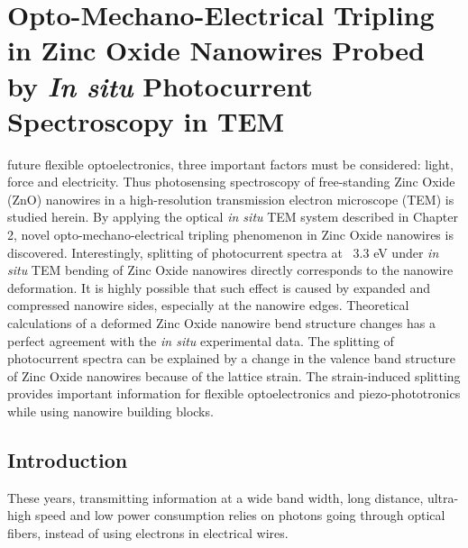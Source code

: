 

\chapter{Opto-Mechano-Electrical Tripling in Zinc Oxide Nanowires Probed by \emph{In situ} Photocurrent Spectroscopy in TEM}

 future flexible optoelectronics, three important factors must be considered: light, force and electricity. 
Thus photosensing spectroscopy of free-standing Zinc Oxide (ZnO) nanowires in a high-resolution transmission electron microscope (TEM) is studied herein. 
By applying the optical {\em in situ} TEM system described in Chapter 2, novel opto-mechano-electrical tripling phenomenon in Zinc Oxide nanowires is discovered. 
Interestingly, splitting of photocurrent spectra at ~3.3 eV under {\em in situ} TEM bending of Zinc Oxide nanowires directly corresponds to the nanowire deformation. It is highly possible that such effect is caused by expanded and compressed nanowire sides, especially at the nanowire edges. 
Theoretical calculations of a deformed Zinc Oxide nanowire bend structure changes has a perfect agreement with the {\em in situ} experimental data. 
The splitting of photocurrent spectra can be explained by a change in the valence band structure of Zinc Oxide nanowires because of the lattice strain. 
The strain-induced splitting provides important information for flexible optoelectronics and piezo-phototronics while using nanowire building blocks. 

\section{Introduction}

These years, transmitting information at a wide band width, long distance, ultra-high speed and low power consumption relies on photons going through optical fibers, instead of using electrons in electrical wires. 

